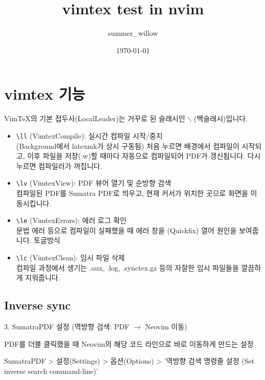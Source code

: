 \documentclass[12pt,a4paper,oneside]{memoir}
\title{vimtex test in nvim}
\author{summer\_willow}
\date{\today}
\begin{document}
\maketitle

\tableofcontents
\newpage

\chapter{vimtex 기능}

VimTeX의 기본 접두사(LocalLeader)는 거꾸로 된 슬래시인 $\backslash$ (백슬래시)입니다. 


\begin{itemize}
\item \verb|\ll| (VimtexCompile): 실시간 컴파일 시작/중지 \\
(Background에서 latexmk가 상시 구동됨)
처음 누르면 배경에서 컴파일이 시작되고, 이후 파일을 저장(:w)할 때마다 자동으로 컴파일되어 PDF가 갱신됩니다. 다시 누르면 컴파일러가 꺼집니다.

\item \verb|\lv| (VimtexView): PDF 뷰어 열기 및 순방향 검색 \\
컴파일된 PDF를 Sumatra PDF로 띄우고, 현재 커서가 위치한 곳으로 화면을 이동시킵니다.

\item \verb|\le| (VimtexErrors): 에러 로그 확인 \\
문법 에러 등으로 컴파일이 실패했을 때 에러 창을 (Quickfix) 열어 원인을 보여줍니다. 토글방식

\item \verb|\lc| (VimtexClean): 임시 파일 삭제 \\
컴파일 과정에서 생기는 .aux, .log, .synctex.gz 등의 자잘한 임시 파일들을 깔끔하게 지워줍니다.

\end{itemize}


\section{Inverse sync}

3. SumatraPDF 설정 (역방향 검색: PDF $\rightarrow$ Neovim 이동)

PDF를 더블 클릭했을 때 Neovim의 해당 코드 라인으로 바로 이동하게 만드는 설정

SumatraPDF > 설정(Settings) > 옵션(Options) > '역방향 검색 명령줄 설정 (Set inverse search command-line)' 
\end{document}
